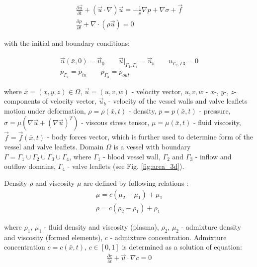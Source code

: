\documentclass[conference]{IEEEtran}
\begin{document}
\begin{gather}
    \label{eq:navier_stokes:motion}
    \frac{\partial \vec{u}}{\partial t} + (\vec{u} \cdot \nabla) \vec{u} = - \frac{1}{\rho} \nabla p + \nabla \sigma + \vec{f}\\
    \label{eq:navier_stokes:continuity}
    \frac{\partial \rho}{\partial t} + \nabla \cdot (\rho \vec{u}) = 0 
\end{gather}

with the initial and boundary conditions:

\begin{gather}
    \label{eq:navier_stokes:velocity_conditions}
    \vec{u}(\bar{x}, 0) = \vec{u}_0 \qquad \vec{u}|_{\Gamma_1, \Gamma_4} = \vec{u}_b \qquad u_{\Gamma_2, \Gamma3} = 0\\
    \label{eq:navier_stokes:pressure_conditions}
    p_{\Gamma_2} = p_{in} \qquad p_{\Gamma_3} = p_{out}
\end{gather}

where $\bar{x}=(x,y,z) \in \Omega$, $\vec{u}=(u,v,w)$ - velocity vector, $u, v, w$ - $x$-, $y$-, $z$-components of velocity vector,
$\vec{u}_b$ - velocity of the vessel walls and valve leaflets motion under deformation,
$\rho=\rho(\bar{x}, t)$ - density, $p=p(\bar{x}, t)$ - pressure, $\sigma = \mu (\nabla \vec{u} + (\nabla \vec{u})^T)$ - viscous stress tensor,
$\mu = \mu(\bar{x}, t)$ - fluid viscosity, $\vec{f} = \vec{f}(\bar{x}, t)$ - body forces vector, which is further used to determine form of the vessel and valve leaflets.
Domain $\Omega$ is a vessel with boundary $\Gamma = \Gamma_1 \cup \Gamma_2 \cup \Gamma_3 \cup \Gamma_4$, where $\Gamma_1$ - blood vessel wall,
$\Gamma_2$ and $\Gamma_3$ - inflow and outflow domains, $\Gamma_4$ - valve leaflets (see Fig. \ref{fig:area_3d}).

Density $\rho$ and viscosity $\mu$ are defined by following relations \cite{gummel}:
\begin{gather}
    \label{eq:viscosity}
    \mu = c (\mu_2 - \mu_1) + \mu_1\\
    \label{eq:density}
    \rho = c (\rho_2 - \rho_1) + \rho_1
\end{gather}

where $\rho_1$, $\mu_1$ - fluid density and viscosity (plasma), $\rho_2$, $\mu_2$ - admixture density and viscosity (formed elements), $c$ - admixture concentration.
Admixture concentration $c=c(\bar{x}, t)$, $c \in [0, 1]$ is determined as a solution of equation:
\begin{gather}
    \label{eq:convection}
    \frac{\partial c}{\partial t} + \vec{u} \cdot \nabla c = 0
\end{gather}
\end{document}
